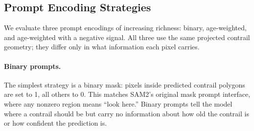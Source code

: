 \documentclass[review]{elsarticle}
\begin{document}
\begin{table}[!tbp]
\centering
\caption{CoCiP configuration used for prompt generation, implemented with \texttt{pycontrails}~\cite{pycontrails}.}
\label{tab:cocip_params}
\end{table}

\subsection{Prompt Encoding Strategies}

We evaluate three prompt encodings of increasing richness: binary, age-weighted, and age-weighted with a negative signal. All three use the same projected contrail geometry; they differ only in what information each pixel carries.

\paragraph{Binary prompts.} The simplest strategy is a binary mask: pixels inside predicted contrail polygons are set to 1, all others to 0. This matches SAM2's original mask prompt interface, where any nonzero region means ``look here.'' Binary prompts tell the model where a contrail should be but carry no information about how old the contrail is or how confident the prediction is.
\end{document}
